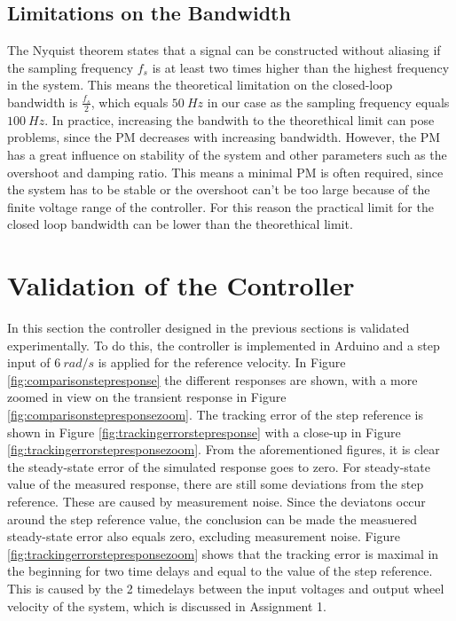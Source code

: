 \documentclass[a4paper,kul]{kulakarticle} %
\begin{document}
\subsection{Limitations on the Bandwidth}
The Nyquist theorem states that a signal can be constructed without aliasing if the sampling frequency $f_s$ is at least two times higher than the highest frequency in the system. This means the theoretical limitation on the closed-loop bandwidth is $\frac{f_s}{2}$, which equals $\SI{50}{Hz}$ in our case as the sampling frequency equals $\SI{100}{Hz}$. In practice, increasing the bandwith to the theorethical limit can pose problems, since the PM decreases with increasing bandwidth. However, the PM has a great influence on stability of the system and other parameters such as the overshoot and damping ratio. This means a minimal PM is often required, since the system has to be stable or the overshoot can't be too large because of the finite voltage range of the controller. For this reason the practical limit for the closed loop bandwidth can be lower than the theorethical limit. 

\section{Validation of the Controller}
In this section the controller designed in the previous sections is validated experimentally. To do this, the controller is implemented in Arduino and a step input of $\SI{6}{rad/s}$ is applied for the reference velocity. In Figure \ref{fig:comparisonstepresponse} the different responses are shown, with a more zoomed in view on the transient response in Figure \ref{fig:comparisonstepresponsezoom}. The tracking error of the step reference is shown in Figure \ref{fig:trackingerrorstepresponse} with a close-up in Figure \ref{fig:trackingerrorstepresponsezoom}. From the aforementioned figures, it is clear the steady-state error of the simulated response goes to zero. For steady-state value of the measured response, there are still some deviations from the step reference. These are caused by measurement noise. Since the deviatons occur around the step reference value, the conclusion can be made the measuered steady-state error also equals zero, excluding measurement noise. Figure \ref{fig:trackingerrorstepresponsezoom} shows that the tracking error is maximal in the beginning for two time delays and equal to the value of the step reference. This is caused by the 2 timedelays between the input voltages and output wheel velocity of the system, which is discussed in Assignment 1. 
\end{document}
